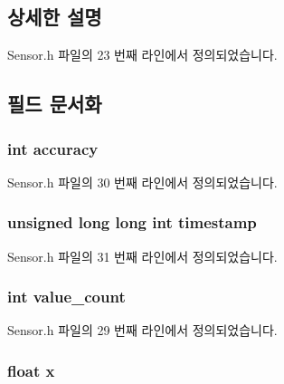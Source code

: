 \subsection{상세한 설명}


Sensor.\-h 파일의 23 번째 라인에서 정의되었습니다.



\subsection{필드 문서화}
\hypertarget{struct__3d__data_a5565cf9073275f9713f9016e7c10d25f}{
\subsubsection[{accuracy}]{\setlength{\rightskip}{0pt plus 5cm}int accuracy}}\label{struct__3d__data_a5565cf9073275f9713f9016e7c10d25f}


Sensor.\-h 파일의 30 번째 라인에서 정의되었습니다.

\hypertarget{struct__3d__data_a8de02c4128636a7bf630ff5428f60c8d}{
\subsubsection[{timestamp}]{\setlength{\rightskip}{0pt plus 5cm}unsigned long long int timestamp}}\label{struct__3d__data_a8de02c4128636a7bf630ff5428f60c8d}


Sensor.\-h 파일의 31 번째 라인에서 정의되었습니다.

\hypertarget{struct__3d__data_a40a079bfc72408819dc78da308203a74}{
\subsubsection[{value\-\_\-count}]{\setlength{\rightskip}{0pt plus 5cm}int value\-\_\-count}}\label{struct__3d__data_a40a079bfc72408819dc78da308203a74}


Sensor.\-h 파일의 29 번째 라인에서 정의되었습니다.

\hypertarget{struct__3d__data_ad0da36b2558901e21e7a30f6c227a45e}{
\subsubsection[{x}]{\setlength{\rightskip}{0pt plus 5cm}float x}}\label{struct__3d__data_ad0da36b2558901e21e7a30f6c227a45e}


